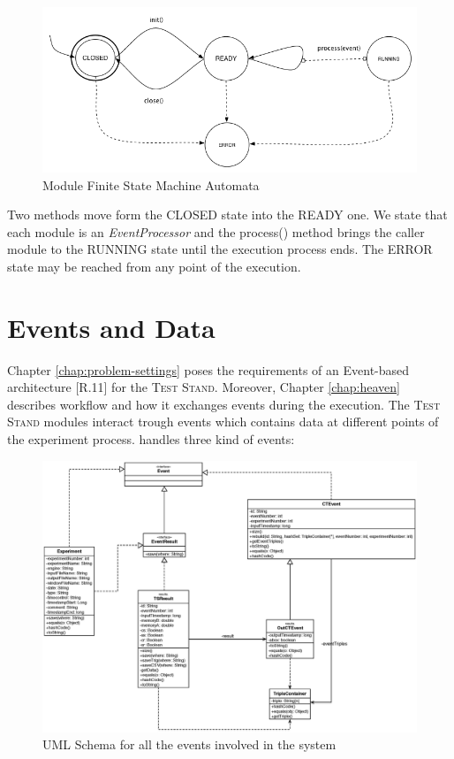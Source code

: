 \begin{figure}[tbh]
  \centering
	\includegraphics[width=\linewidth]{images/fsm-schema}
	\caption{Module Finite State Machine Automata} 
  	\label{fig:module-fsm}
\end{figure}

Two methods move form the CLOSED state into the READY one. We state that each module is an \textit{EventProcessor} and the process() method brings the caller module to the RUNNING state until the execution process ends. The ERROR state may be reached from any point of the execution.

\section{Events and Data}\label{sec:data-impl}

Chapter \ref{chap:problem-settings} poses the requirements of an Event-based architecture [R.11] for the \textsc{Test Stand}. Moreover, Chapter \ref{chap:heaven} describes \name workflow and how it exchanges events during the execution. The \textsc{Test Stand} modules interact trough events which contains data at different points of the experiment process. \name handles three kind of events:

\begin{figure}[tbh]
  \centering
	\includegraphics[width=\linewidth]{images/uml_events}
	\caption{UML Schema for all the events involved in the system} 
  	\label{fig:uml_events}
\end{figure}

